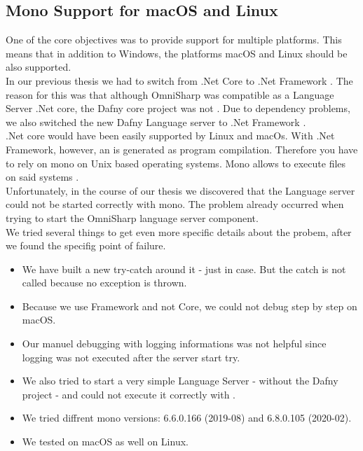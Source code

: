 
\subsection{Mono Support for macOS and Linux}
\label{section:implementation:mono}
One of the core objectives was to provide support for multiple platforms.
This means that in addition to Windows, the platforms macOS and Linux should be also supported. \\

In our previous thesis we had to switch from .Net Core to .Net Framework \cite{sa}.
The reason for this was that although OmniSharp was compatible as a Language Server .Net core,
the Dafny core project was not \cite{sa}.
Due to dependency problems, we also switched the new Dafny Language server to .Net Framework \cite{sa}. \\

.Net core would have been easily supported by Linux and macOs.
With .Net Framework, however, an  is generated as program compilation.
Therefore you have to rely on mono on Unix based operating systems.
Mono allows to execute  files on said systems \cite{mono}. \\

Unfortunately, in the course of our thesis we discovered that the Language server could not be started correctly with mono.
The problem already occurred when trying to start the OmniSharp language server component. \\

We tried several things to get even more specific details about the probem, after we found the specifig point of failure.

\begin{itemize}
    \item We have built a new try-catch around it - just in case. But the catch is not called because no exception is thrown.
    \item Because we use Framework and not Core, we could not debug step by step on macOS.
    \item Our manuel debugging with logging informations was not helpful since logging was not executed after the server start try.
    \item We also tried to start a very simple Language Server - without the Dafny project - and could not execute it correctly with .
    \item We tried diffrent mono versions: 6.6.0.166 (2019-08) and 6.8.0.105 (2020-02).
    \item We tested on macOS as well on Linux.
\end{itemize}

